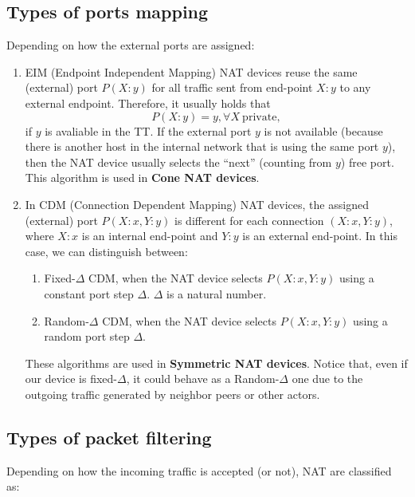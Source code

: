 \subsection{Types of ports mapping}

Depending on how the external ports are assigned:

\begin{enumerate}
\item EIM (Endpoint Independent Mapping) NAT devices reuse the same
  (external) port $P(X:y)$ for all traffic sent from
  end-point $X:y$ to any external endpoint. Therefore, it usually
  holds that
  \begin{equation}
    P(X:y)=y, \forall X~\mathrm{private},
  \end{equation}
  if $y$ is avaliable in the TT. If the external port $y$ is not
  available (because there is another host in the internal network
  that is using the same port $y$), then the NAT device usually
  selects the ``next'' (counting from $y$) free port.  This algorithm
  is used in \textbf{Cone NAT devices}.
\item In CDM (Connection Dependent Mapping) NAT devices, the assigned
  (external) port $P(X:x,Y:y)$ is different for each connection
  $(X:x,Y:y)$, where $X:x$ is an internal end-point and $Y:y$ is an
  external end-point. In this case, we can distinguish between:
  \begin{enumerate}
  \item Fixed-$\Delta$ CDM, when the NAT device selects $P(X:x,Y:y)$
    using a constant port step $\Delta$. $\Delta$ is a natural number.
  \item Random-$\Delta$ CDM, when the NAT device selects $P(X:x,Y:y)$
      using a random port step $\Delta$.
  \end{enumerate}
  These algorithms are used in \textbf{Symmetric NAT devices}. Notice
  that, even if our device is fixed-$\Delta$, it could behave as a
  Random-$\Delta$ one due to the outgoing traffic generated by
  neighbor peers or other actors.
\end{enumerate}

\subsection{Types of packet filtering}

Depending on how the incoming traffic is accepted (or not), NAT are
classified as:

